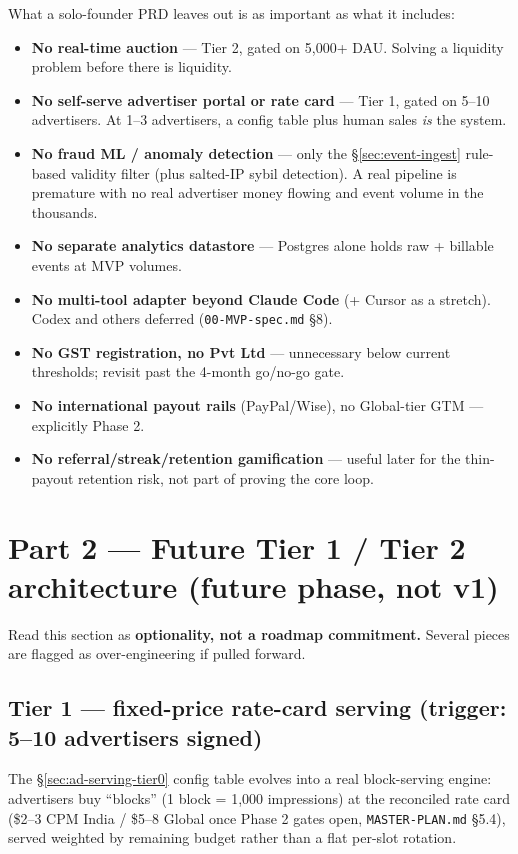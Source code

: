 What a solo-founder PRD leaves out is as important as what it includes:

\begin{itemize}
  \item \textbf{No real-time auction} --- Tier 2, gated on 5,000+ DAU. Solving a liquidity problem before there is liquidity.
  \item \textbf{No self-serve advertiser portal or rate card} --- Tier 1, gated on 5--10 advertisers. At 1--3 advertisers, a config table plus human sales \textit{is} the system.
  \item \textbf{No fraud ML / anomaly detection} --- only the \S\ref{sec:event-ingest} rule-based validity filter (plus salted-IP sybil detection). A real pipeline is premature with no real advertiser money flowing and event volume in the thousands.
  \item \textbf{No separate analytics datastore} --- Postgres alone holds raw + billable events at MVP volumes.
  \item \textbf{No multi-tool adapter beyond Claude Code} (+ Cursor as a stretch). Codex and others deferred (\texttt{00-MVP-spec.md} \S8).
  \item \textbf{No GST registration, no Pvt Ltd} --- unnecessary below current thresholds; revisit past the 4-month go/no-go gate.
  \item \textbf{No international payout rails} (PayPal/Wise), no Global-tier GTM --- explicitly Phase 2.
  \item \textbf{No referral/streak/retention gamification} --- useful later for the thin-payout retention risk, not part of proving the core loop.
\end{itemize}

\section{Part 2 --- Future Tier 1 / Tier 2 architecture (future phase, not v1)}
\label{sec:part2-future}

Read this section as \textbf{optionality, not a roadmap commitment.} Several pieces are flagged as over-engineering if pulled forward.

\subsection{Tier 1 --- fixed-price rate-card serving (trigger: 5--10 advertisers signed)}
\label{sec:tier1}

The \S\ref{sec:ad-serving-tier0} config table evolves into a real block-serving engine: advertisers buy ``blocks'' (1 block = 1,000 impressions) at the reconciled rate card (\$2--3 CPM India / \$5--8 Global once Phase 2 gates open, \texttt{MASTER-PLAN.md} \S5.4), served weighted by remaining budget rather than a flat per-slot rotation.

